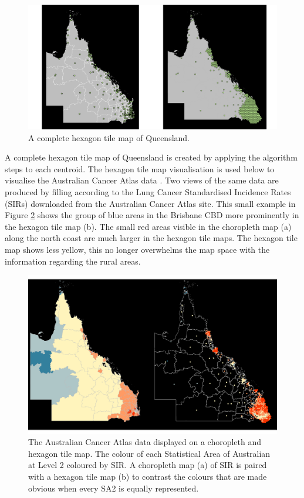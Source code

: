 \begin{figure}[h]
\centering
\includegraphics[width=16cm]{figs/6allocate.pdf}
\caption{\label{fig:buffs}A complete hexagon tile map of Queensland.}
\end{figure}

A complete hexagon tile map of Queensland is created by applying the
algorithm steps to each centroid. The hexagon tile map visualisation is
used below to visualise the Australian Cancer Atlas data \citep{TACA}.
Two views of the same data are produced by filling according to the Lung
Cancer Standardised Incidence Rates (SIRs) downloaded from the
Australian Cancer Atlas site. This small example in Figure \ref{fig:sir}
shows the group of blue areas in the Brisbane CBD more prominently in
the hexagon tile map (b). The small red areas visible in the choropleth
map (a) along the north coast are much larger in the hexagon tile maps.
The hexagon tile map shows less yellow, this no longer overwhelms the
map space with the information regarding the rural areas.

\begin{figure}[h]
\centering
\includegraphics[width=14cm]{figs/7SIR.pdf}
\caption{\label{fig:sir}The Australian Cancer Atlas data displayed on a choropleth and hexagon tile map. The colour of each Statistical Area of Australian at Level 2 coloured by SIR. A choropleth map (a) of SIR is paired with a hexagon tile map (b) to contrast the colours that are made obvious when every SA2 is equally represented.}
\end{figure}

